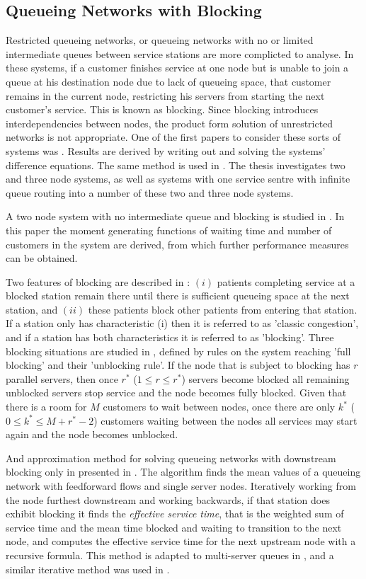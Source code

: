 \documentclass{article}
\begin{document}
\subsection{Queueing Networks with Blocking}
Restricted queueing networks, or queueing networks with no or limited intermediate queues between service stations are more complicted to analyse.
In these systems, if a customer finishes service at one node but is unable to join a queue at his destination node due to lack of queueing space, that customer remains in the current node, restricting his servers from starting the next customer's service.
This is known as blocking.
Since blocking introduces interdependencies between nodes, the product form solution of unrestricted networks is not appropriate.
One of the first papers to consider these sorts of systems was \cite{hunt56}.
Results are derived by writing out and solving the systems' difference equations.
The same method is used in \cite{baber08}.
The thesis investigates two and three node systems, as well as systems with one service sentre with infinite queue routing into a number of these two and three node systems.

A two node system with no intermediate queue and blocking is studied in \cite{aviitzhakyadin65}.
In this paper the moment generating functions of waiting time and number of customers in the system are derived, from which further performance measures can be obtained.

Two features of blocking are described in \cite{koizumietal05}: $(i)$ patients completing service at a blocked station remain there until there is sufficient queueing space at the next station, and $(ii)$ these patients block other patients from entering that station.
If a station only has characteristic (i) then it is referred to as 'classic congestion', and if a station has both characteristics it is referred to as 'blocking'.
Three blocking situations are studied in \cite{latoucheneuts80}, defined by rules on the system reaching 'full blocking' and their 'unblocking rule'.
If the node that is subject to blocking has $r$ parallel servers, then once $r^*$ ($1\leq r\leq r^*$) servers become blocked all remaining unblocked servers stop service and the node becomes fully blocked.
Given that there is a room for $M$ customers to wait between nodes, once there are only $k^*$ ($0\leq k^*\leq M+r^*-2$) customers waiting between the nodes all services may start again and the node becomes unblocked.

And approximation method for solving queueing networks with downstream blocking only in presented in \cite{takahashi80}.
The algorithm finds the mean values of a queueing network with feedforward flows and single server nodes.
Iteratively working from the node furthest downstream and working backwards, if that station does exhibit blocking it finds the \textit{effective service time}, that is the weighted sum of service time and the mean time blocked and waiting to transition to the next node, and computes the effective service time for the next upstream node with a recursive formula.
This method is adapted to multi-server queues in \cite{koizumietal05}, and a similar iterative method was used in \cite{korporaaletal00}.
\end{document}
